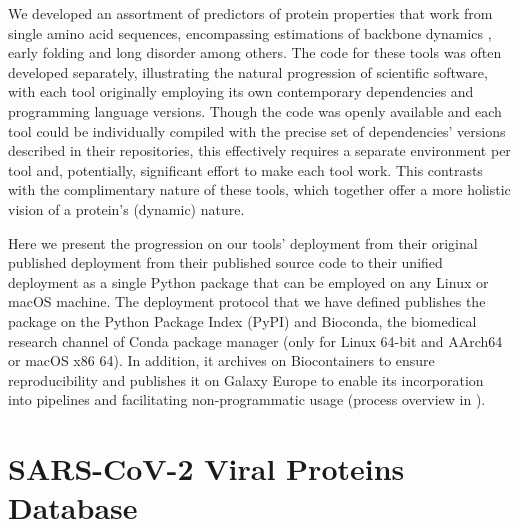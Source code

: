 We developed an assortment of predictors of protein properties that work from single amino acid sequences, encompassing estimations of backbone dynamics \cite{cilia_protein_2013, cilia_dynamine_2014}, early folding \cite{raimondi_exploring_2017} and long disorder \cite{orlando_prediction_2022} among others. The code for these tools was often developed separately, illustrating the natural progression of scientific software, with each tool originally employing its own contemporary dependencies and programming language versions. Though the code was openly available and each tool could be individually compiled with the precise set of dependencies' versions described in their repositories, this effectively requires a separate environment per tool and, potentially, significant effort to make each tool work. This contrasts with the complimentary nature of these tools, which together offer a more holistic vision of a protein's (dynamic) nature.

Here we present the progression on our tools' deployment from their original published deployment from their published source code to their unified deployment as a single Python package that can be employed on any Linux or macOS machine. The deployment protocol that we have defined publishes the package on the Python Package Index (PyPI) \cite{pypi} and Bioconda, the biomedical research channel of Conda package manager (only for Linux 64-bit and AArch64 or macOS x86 64)\cite{gruning_bioconda_2018}. In addition, it archives on Biocontainers \cite{da_veiga_leprevost_biocontainers_2017} to ensure reproducibility and publishes it on Galaxy \cite{afgan_galaxy_2018} Europe to enable its incorporation into pipelines and facilitating non-programmatic usage (process overview in ). 

\section{SARS-CoV-2 Viral Proteins Database}

